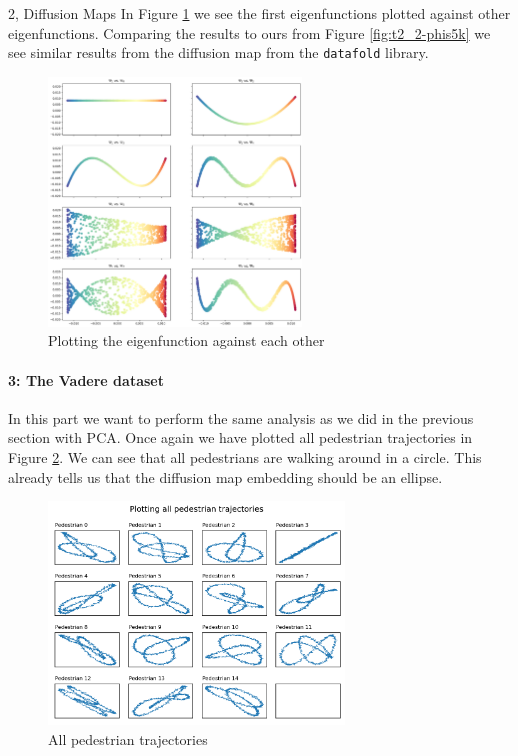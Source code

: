 \begin{task}{2, Diffusion Maps}
In Figure \ref{fig:t2_2-bonusB} we see the first eigenfunctions plotted against other eigenfunctions. Comparing the results to ours from Figure \ref{fig:t2_2-phis5k} we see similar results from the diffusion map from the \verb|datafold| library.
\begin{figure}[H]
\centering
\includegraphics[width=0.6\textwidth]{images_task2/t2_2-bonusPhis.png}
\caption{Plotting the eigenfunction against each other}
\label{fig:t2_2-bonusB}
\end{figure}

\paragraph{3: The Vadere dataset}
In this part we want to perform the same analysis as we did in the previous section with PCA. Once again we have plotted all pedestrian trajectories in Figure \ref{fig:t2_3-allTraj}. We can see that all pedestrians are walking around in a circle. This already tells us that the diffusion map embedding should be an ellipse.
\begin{figure}[H]
\centering
\includegraphics[width=0.7\textwidth]{images_task2/t2_3-allTraj.png}
\caption{All pedestrian trajectories}
\label{fig:t2_3-allTraj}
\end{figure}


\end{task}
